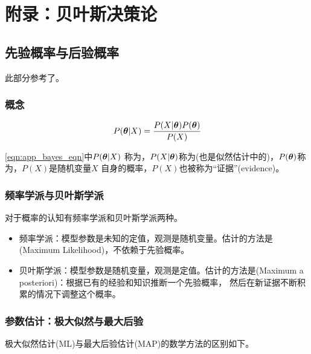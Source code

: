 \chapter{附录：贝叶斯决策论}
\label{app:entory}

\section{先验概率与后验概率}
此部分参考了\cite{MLEAndMAP}。

\subsection{概念}
\[
    P({\bm{\theta}} \vert X) = \frac{P(X \vert {\bm{\theta}} )P({\bm{\theta}})}{P(X)}
    \label{eqn:app_bayes_eqn}
\]
 
\eqref{eqn:app_bayes_eqn}中$P({\bm{\theta}} \vert X)$ 称为，$P(X\vert{\bm{\theta}} )$称为(也是似然估计中的)，$P({\bm{\theta}})$称为，$P(X)$是随机变量$X$ 自身的概率，$P(X)$也被称为“证据”(evidence)。

\subsection{频率学派与贝叶斯学派} 

对于概率的认知有频率学派和贝叶斯学派两种。
\begin{itemize}
    \item  频率学派：模型参数是未知的定值，观测是随机变量。估计的方法是(Maximum Likelihood)，不依赖于先验概率。
    \item  贝叶斯学派：模型参数是随机变量，观测是定值。估计的方法是(Maximum a posteriori)：根据已有的经验和知识推断一个先验概率， 然后在新证据不断积累的情况下调整这个概率。
\end{itemize}


\subsection{参数估计：极大似然与最大后验} 
极大似然估计(ML)与最大后验估计(MAP)的数学方法的区别如下。

